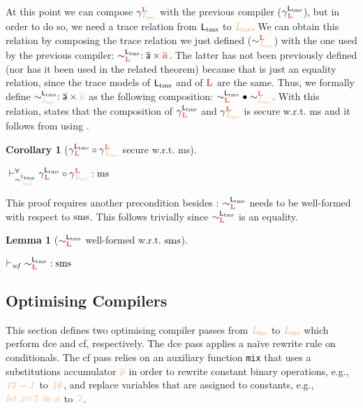 \documentclass[acmsmall]{acmart}
\theoremstyle{definition}
\newtheorem{lemma}{Lemma}[section]
\newtheorem{corollary}{Corollary}[section]
\begin{document}
At this point we can compose $\ccb$ with the previous compiler ($\cca$), but in order to do so, we need a trace relation from $\mathsf{L_{\operatorname{tms}}}$ to $\Lms$.
% 
We can obtain this relation by composing the trace relation we just defined ($\sim^{\Ltrg}_{\Lms}$) with the one used by the previous compiler: $\sim^{\Ltms}_{\Ltrg} : \src{\trace}\times\trg{\trace}$.
% 
The latter has not been previously defined (nor has it been used in the related theorem) because that is just an equality relation, since the trace models of $\mathsf{L_{\operatorname{tms}}}$ and of $\Ltrg$ are the same.
% 
Thus, we formally define $\sim^{\Ltms}_{\Lms}: \src{\trace} \times \irl{\trace}$ as the following composition: $\sim^{\Ltms}_{\Ltrg}\bullet\sim^{\Ltrg}_{\Lms}$.
% 
With this relation,  states that the composition of $\cca$ and $\ccb$ is secure w.r.t. \gls*{ms} and it follows from  using .
% 
\begin{corollary}[$\cca\circ\ccb$ secure w.r.t. \gls*{ms}]\label{corr:ccab:rtp:ms}
  $\;$ 

  \begin{nscenter}
    $\rtpsim{\cca\circ\ccb}{\mssafe}{\sim^{\Ltms}_{\Lms}}$ %
  \end{nscenter}
\end{corollary}
% 
This proof requires another precondition besides : $\sim^{\Ltms}_{\Ltrg}$ needs to be well-formed with respect to $\operatorname{sms}$.
This follows trivially since $\sim^{\Ltms}_{\Ltrg}$ is an equality. 
% 
\begin{lemma}[$\sim^{\Ltms}_{\Ltrg}$ well-formed w.r.t. $\operatorname{sms}$]\label{lem:wf:ltmsltrg}
$\;$ 

  \begin{nscenter}
  $\wfcsig{\sim^{\Ltms}_{\Ltrg}}{\smssafe}$
  \end{nscenter}
\end{lemma}

\subsection{Optimising Compilers}\label{subsec:cs:opts} 

This section defines two optimising compiler passes from $\Lms$ to $\Lms$ which perform \gls*{dce} and \gls*{cf}, respectively.
The \gls*{dce} pass applies a na\"ive rewrite rule on conditionals.
The \gls*{cf} pass relies on an auxiliary function \texttt{mix} that uses a substitutions accumulator $\irl{\substlist}$ in order to rewrite constant binary operations, e.g., $\irl{{17}-1}$ to $\irl{16}$, and replace variables that are assigned to constants, e.g., $\irl{\llet{x}{7}{x}}$ to $\irl{7}$.
\end{document}
